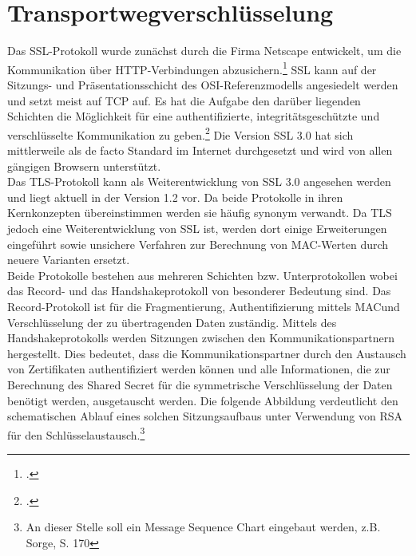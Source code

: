\chapter{Transportwegverschlüsselung}
Das \ac{SSL}-Protokoll wurde zunächst durch die Firma Netscape entwickelt, um die Kommunikation über \ac{HTTP}-Verbindungen abzusichern.\footcite[S. 796]{Eckert2013} \ac{SSL} kann auf der Sitzungs- und Präsentationsschicht des \ac{OSI}-Referenzmodells angesiedelt werden und setzt meist auf \ac{TCP} auf. Es hat die Aufgabe den darüber liegenden Schichten die Möglichkeit für eine authentifizierte, integritätsgeschützte und verschlüsselte Kommunikation zu geben.\footcite[Vgl.][S. 799 ff.]{Eckert2013}
Die Version \ac{SSL} 3.0 hat sich mittlerweile als de facto Standard im Internet durchgesetzt und wird von allen gängigen Browsern unterstützt.\\
Das \ac{TLS}-Protokoll kann als Weiterentwicklung von \ac{SSL} 3.0 angesehen werden und liegt aktuell in der Version 1.2 vor. Da beide Protokolle in ihren Kernkonzepten übereinstimmen werden sie häufig synonym verwandt. Da \ac{TLS} jedoch eine Weiterentwicklung von \ac{SSL} ist, werden dort einige Erweiterungen eingeführt sowie unsichere Verfahren zur Berechnung von \ac{MAC}-Werten durch neuere Varianten ersetzt.\\
Beide Protokolle bestehen aus mehreren Schichten bzw. Unterprotokollen wobei das Record- und das Handshakeprotokoll von besonderer Bedeutung sind. Das Record-Protokoll ist für die Fragmentierung, Authentifizierung mittels \ac{MAC}und Verschlüsselung der zu übertragenden Daten zuständig. Mittels des Handshakeprotokolls werden Sitzungen zwischen den Kommunikationspartnern hergestellt. Dies bedeutet, dass die Kommunikationspartner durch den Austausch von Zertifikaten authentifiziert werden können und alle Informationen, die zur Berechnung des Shared Secret für die symmetrische Verschlüsselung der Daten benötigt werden, ausgetauscht werden. Die folgende Abbildung verdeutlicht den schematischen Ablauf eines solchen Sitzungsaufbaus unter Verwendung von \ac{RSA} für den Schlüsselaustausch.\footnote{An dieser Stelle soll ein Message Sequence Chart eingebaut werden, z.B. Sorge, S. 170}\\

	